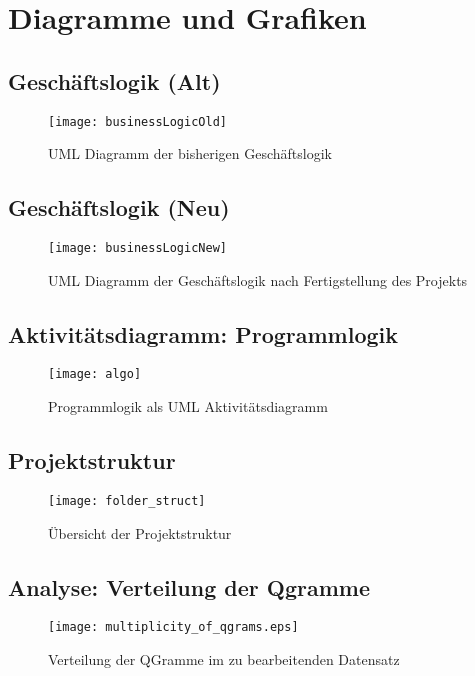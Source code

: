 \appendix
\label{section:anhang}
\section{Diagramme und Grafiken}

\subsection{Geschäftslogik (Alt)}
\begin{figure}[!htp]
	\caption{UML Diagramm der bisherigen Geschäftslogik}
	\label{fig:businessLogicAlt}
    \texttt{[image: businessLogicOld]}
\end{figure}

\subsection{Geschäftslogik (Neu)}
\begin{figure}[!htp]
	\caption{UML Diagramm der Geschäftslogik nach Fertigstellung des Projekts}
	\label{fig:businessLogicAlt}
    \texttt{[image: businessLogicNew]}
\end{figure}


\subsection{Aktivitätsdiagramm: Programmlogik}
\begin{figure}[!htp]
	\caption{Programmlogik als UML Aktivitätsdiagramm}
	\label{fig:programmlogik}
	\texttt{[image: algo]}
	\centering
\end{figure}

\subsection{Projektstruktur}
\begin{figure}[!htp]
	\caption{Übersicht der Projektstruktur}
	\label{fig:folderstruct}
	\texttt{[image: folder\_struct]}
\end{figure}

\subsection{Analyse: Verteilung der Qgramme}
\begin{figure}[!htp]
    \caption{Verteilung der QGramme im zu bearbeitenden Datensatz}
    \label{fig:qgram_verteilung}
    \texttt{[image: multiplicity\_of\_qgrams.eps]}
    \centering
\end{figure}

